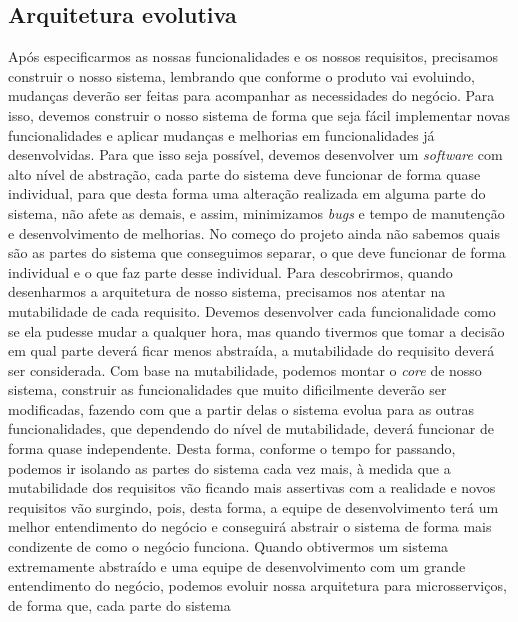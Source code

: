     \subsection{Arquitetura evolutiva}
      Após especificarmos as nossas funcionalidades e os nossos requisitos, precisamos
      construir o nosso sistema, lembrando que conforme o produto vai evoluindo,
      mudanças deverão ser feitas para acompanhar as necessidades do negócio. Para
      isso, devemos construir o nosso sistema de forma que seja fácil implementar novas
      funcionalidades e aplicar mudanças e melhorias em funcionalidades já desenvolvidas.
      Para que isso seja possível, devemos desenvolver um \textit{software} com alto
      nível de abstração, cada parte do sistema deve funcionar de forma quase
      individual, para que desta forma uma alteração realizada em alguma parte do
      sistema, não afete as demais, e assim, minimizamos \textit{bugs} e tempo de
      manutenção e desenvolvimento de melhorias. \newline
      No começo do projeto ainda não sabemos quais são as partes do sistema que
      conseguimos separar, o que deve funcionar de forma individual e o que faz
      parte desse individual. Para descobrirmos, quando desenharmos a arquitetura
      de nosso sistema, precisamos nos atentar na mutabilidade de cada requisito.
      Devemos desenvolver cada funcionalidade como se ela pudesse mudar a qualquer
      hora, mas quando tivermos que tomar a decisão em qual parte deverá ficar menos
      abstraída, a mutabilidade do requisito deverá ser considerada. Com base na
      mutabilidade, podemos montar o \textit{core} de nosso sistema, construir
      as funcionalidades que muito dificilmente deverão ser modificadas, fazendo
      com que a partir delas o sistema evolua para as outras funcionalidades, que
      dependendo do nível de mutabilidade, deverá funcionar de forma quase independente.
      Desta forma, conforme o tempo for passando, podemos ir isolando as partes
      do sistema cada vez mais, à medida que a mutabilidade dos requisitos vão
      ficando mais assertivas com a realidade e novos requisitos vão surgindo, pois,
      desta forma, a equipe de desenvolvimento terá um melhor entendimento do negócio
      e conseguirá abstrair o sistema de forma mais condizente de como o negócio
      funciona. Quando obtivermos um sistema extremamente abstraído e uma equipe
      de desenvolvimento com um grande entendimento do negócio, podemos evoluir
      nossa arquitetura para microsserviços, de forma que, cada parte do sistema
